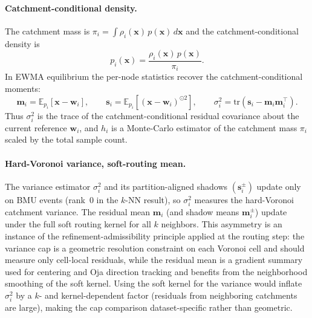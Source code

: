 \documentclass[11pt]{article}
\begin{document}
\paragraph{Catchment-conditional density.}
The catchment mass is $\pi_i=\int\rho_i(\mathbf x)\,p(\mathbf x)\,d\mathbf x$ and the catchment-conditional density is
\[
p_i(\mathbf x)=\frac{\rho_i(\mathbf x)\,p(\mathbf x)}{\pi_i}.
\]
In EWMA equilibrium the per-node statistics recover the catchment-conditional moments:
\[
\mathbf m_i=\mathbb E_{p_i}[\mathbf x-\mathbf w_i],
\qquad
\mathbf s_i=\mathbb E_{p_i}[(\mathbf x-\mathbf w_i)^{\odot 2}],
\qquad
\sigma_i^2=\mathrm{tr}(\mathbf s_i-\mathbf m_i\mathbf m_i^\top).
\]
Thus $\sigma_i^2$ is the trace of the catchment-conditional residual covariance about the current reference $\mathbf w_i$, and $h_i$ is a Monte-Carlo estimator of the catchment mass $\pi_i$ scaled by the total sample count.

\paragraph{Hard-Voronoi variance, soft-routing mean.}
The variance estimator $\sigma_i^2$ and its partition-aligned shadows $(\mathbf s_i^\pm)$ update only on BMU events (rank~0 in the $k$-NN result), so $\sigma_i^2$ measures the hard-Voronoi catchment variance. The residual mean $\mathbf m_i$ (and shadow means $\mathbf m_i^\pm$) update under the full soft routing kernel for all $k$ neighbors. This asymmetry is an instance of the refinement-admissibility principle applied at the routing step: the variance cap is a geometric resolution constraint on each Voronoi cell and should measure only cell-local residuals, while the residual mean is a gradient summary used for centering and Oja direction tracking and benefits from the neighborhood smoothing of the soft kernel. Using the soft kernel for the variance would inflate $\sigma_i^2$ by a $k$- and kernel-dependent factor (residuals from neighboring catchments are large), making the cap comparison dataset-specific rather than geometric.
\end{document}
